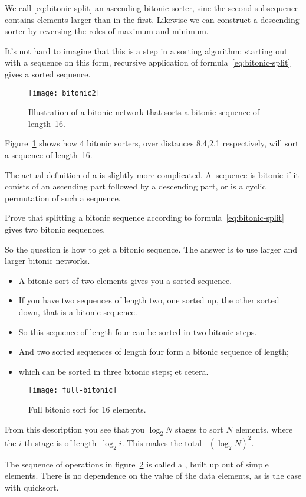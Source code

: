We call \eqref{eq:bitonic-split} an ascending bitonic sorter, sinc the
second subsequence contains elements larger than in the
first. Likewise we can construct a descending sorter by reversing the
roles of maximum and minimum.

It's not hard to imagine that this is a step in a sorting algorithm:
starting out with a sequence on this form, recursive application 
of formula~\eqref{eq:bitonic-split} gives a sorted sequence.
\begin{figure}[ht]
\texttt{[image: bitonic2]}
\caption{Illustration of a  bitonic network that sorts a bitonic sequence of length~16.}
\label{fig:bitonic8421}
\end{figure}
Figure~\ref{fig:bitonic8421} shows how 4 bitonic sorters, over
distances 8,4,2,1 respectively, will sort a sequence of length~16.

The actual definition of a  is slightly more
complicated. A~sequence is bitonic if it conists of an ascending part followed 
by a descending part, or is a cyclic permutation of such a sequence.
\begin{exercise}
Prove that splitting a bitonic sequence according to
formula~\eqref{eq:bitonic-split} gives two bitonic sequences.
\end{exercise}

So the question is how to get a bitonic sequence. The answer is to
use larger and larger bitonic networks.
\begin{itemize}
\item A bitonic sort of two elements gives you a sorted sequence.
\item If you have two sequences of length two, one sorted up, the
  other sorted down, that is a bitonic sequence.
\item So this sequence of length four can be sorted in two bitonic steps.
\item And two sorted sequences of length four form a bitonic sequence of length;
\item which can be sorted in three bitonic steps; et cetera.
\end{itemize}
\begin{figure}[ht]
  \texttt{[image: full-bitonic]}
  \caption{Full bitonic sort for 16 elements.}
  \label{fig:full-bitonic}
\end{figure}
From this description you see that you $\log_2N$ stages to sort $N$
elements, where the $i$-th stage is of length~$\log_2i$. This makes
the total
%
~$(\log_2N)^2$.

The sequence of operations in figure~\ref{fig:full-bitonic}
is called a , built up out of simple 
 elements. There is no dependence 
on the value of the data elements, as is the case with quicksort.



